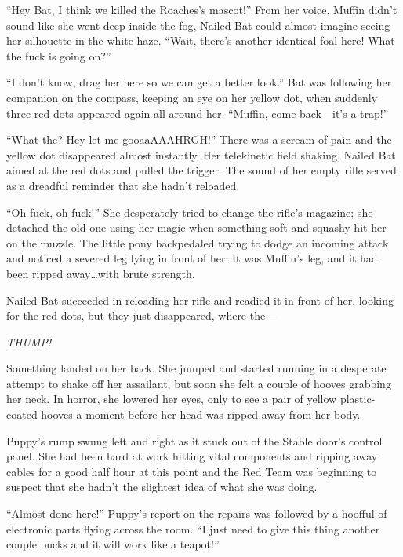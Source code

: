 ``Hey Bat, I think we killed the Roaches's mascot!'' From her voice, Muffin didn't sound like she went deep inside the fog, Nailed Bat could almost imagine seeing her silhouette in the white haze. ``Wait, there's another identical foal here! What the fuck is going on?''

``I don't know, drag her here so we can get a better look.'' Bat was following her companion on the compass, keeping an eye on her yellow dot, when suddenly three red dots appeared again all around her. ``Muffin, come back---it's a trap!''

``What the? Hey let me gooaaAAAHRGH!'' There was a scream of pain and the yellow dot disappeared almost instantly. Her telekinetic field shaking, Nailed Bat aimed at the red dots and pulled the trigger. The sound of her empty rifle served as a dreadful reminder that she hadn't reloaded.

``Oh fuck, oh fuck!'' She desperately tried to change the rifle's magazine; she detached the old one using her magic when something soft and squashy hit her on the muzzle. The little pony backpedaled trying to dodge an incoming attack and noticed a severed leg lying in front of her. It was Muffin's leg, and it had been ripped away\dots with brute strength.

Nailed Bat succeeded in reloading her rifle and readied it in front of her, looking for the red dots, but they just disappeared, where the---

\emph{THUMP!}

Something landed on her back. She jumped and started running in a desperate attempt to shake off her assailant, but soon she felt a couple of hooves grabbing her neck. In horror, she lowered her eyes, only to see a pair of yellow plastic-coated hooves a moment before her head was ripped away from her body.


\horizonline


Puppy's rump swung left and right as it stuck out of the Stable door's control panel. She had been hard at work hitting vital components and ripping away cables for a good half hour at this point and the Red Team was beginning to suspect that she hadn't the slightest idea of what she was doing.

``Almost done here!'' Puppy's report on the repairs was followed by a hoofful of electronic parts flying across the room. ``I just need to give this thing another couple bucks and it will work like a teapot!''

